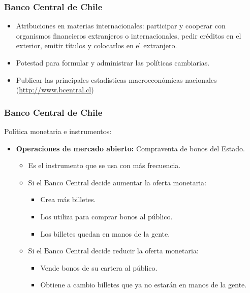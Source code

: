 \documentclass[dvipsnames,table,leqno]{beamer}
\begin{document}
		\begin{frame}
			\frametitle{Banco Central de Chile}
			\begin{itemize}
				\item Atribuciones en materias internacionales: participar y cooperar con organismos financieros extranjeros o internacionales, pedir créditos en el exterior, emitir títulos y colocarlos en el extranjero.
				\item Potestad para formular y administrar las políticas cambiarias.
				\item Publicar las principales estadísticas macroeconómicas nacionales (\url{http://www.bcentral.cl})
			\end{itemize}
		\end{frame}

		\begin{frame}
			\frametitle{Banco Central de Chile}
			Política monetaria e instrumentos:
			\begin{itemize}
				\item \textbf{Operaciones de mercado abierto:} Compraventa de bonos del Estado.
					\begin{itemize}
						\item Es el instrumento que se usa con más frecuencia.
						\item Si el Banco Central decide aumentar la oferta monetaria:
							\begin{itemize}
								\item Crea más billetes.
								\item Los utiliza para comprar bonos al público.
								\item Los billetes quedan en manos de la gente.
							\end{itemize}
						\item Si el Banco Central decide reducir la oferta monetaria:
							\begin{itemize}
								\item Vende bonos de su cartera al público.
								\item Obtiene a cambio billetes que ya no estarán en manos de la gente.
							\end{itemize}
					\end{itemize}
			\end{itemize}
		\end{frame}
\end{document}
